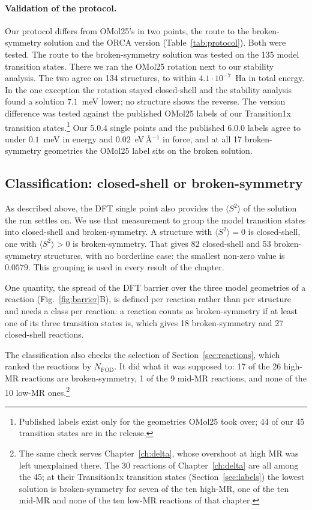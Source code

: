 \paragraph{Validation of the protocol.} Our protocol differs from
OMol25's in two points, the route to the broken-symmetry solution and
the ORCA version (Table~\ref{tab:protocol}). Both were tested.
The route to the broken-symmetry solution was tested on the 135 model
transition states. There we ran
the OMol25 rotation next to our stability analysis. The two agree on
134 structures, to within $4.1\cdot10^{-7}$~Ha in total energy. In the
one exception the rotation stayed closed-shell and the stability
analysis found a solution $7.1$~meV lower; no structure shows the
reverse. The version difference was tested against the published OMol25
labels of our Transition1x transition states.\footnote{Published
labels exist only for the geometries OMol25 took over; 44 of our 45
transition states are in the release.} Our 5.0.4 single points and
the published 6.0.0 labels agree to under $0.1$~meV in energy and
$0.02$~eV\,\AA$^{-1}$ in force, and at all 17 broken-symmetry
geometries the OMol25 label sits on the broken solution.


\subsection{Classification: closed-shell or broken-symmetry}
\label{sec:classification}

As described above, the DFT single point also provides the
$\langle S^2\rangle$ of the solution the run settles on. We use that
measurement to group the model transition states into closed-shell
and broken-symmetry. A structure with $\langle S^2\rangle = 0$ is
closed-shell, one with $\langle S^2\rangle > 0$ is broken-symmetry. That
gives 82 closed-shell and 53 broken-symmetry structures, with no
borderline case: the smallest non-zero value is $0.0579$. This
grouping is used in every result of the chapter.

One quantity, the spread of the DFT barrier over the three model
geometries of a reaction (Fig.~\ref{fig:barrier}B), is defined per
reaction rather than per structure and needs a class per reaction: a
reaction counts as broken-symmetry if at least one of its three
transition states is, which gives 18 broken-symmetry and 27
closed-shell reactions.

The classification also checks the selection of
Section~\ref{sec:reactions}, which ranked the reactions by
$N_\mathrm{FOD}$. It did what it was supposed to: 17 of the 26 high-MR reactions are broken-symmetry, 1 of
the 9 mid-MR reactions, and none of the 10 low-MR
ones.\footnote{The same check serves Chapter~\ref{ch:delta}, whose
overshoot at high MR was left unexplained there. The 30 reactions of
Chapter~\ref{ch:delta} are all among the 45; at their Transition1x
transition states (Section~\ref{sec:labels}) the lowest solution is
broken-symmetry for seven of the ten high-MR, one of the ten mid-MR
and none of the ten low-MR reactions of that chapter.}

